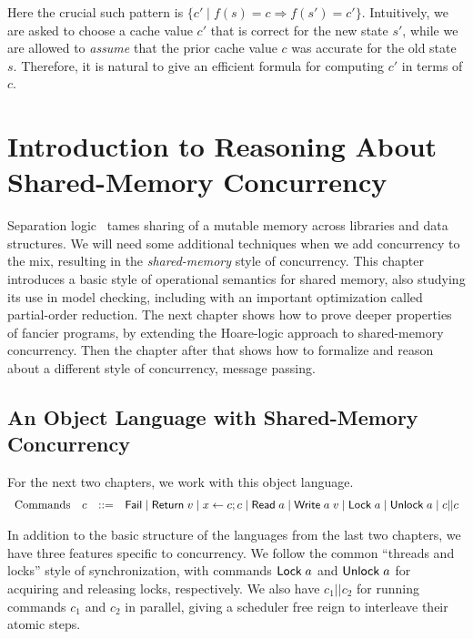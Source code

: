 \documentclass{amsbook}
\theoremstyle{definition}
\theoremstyle{remark}
\numberwithin{section}{chapter}
\numberwithin{equation}{chapter}
\begin{document}
Here the crucial such pattern is $\{c' \mid f(s) = c \Rightarrow f(s') = c'\}$.
Intuitively, we are asked to choose a cache value $c'$ that is correct for the new state $s'$, while we are allowed to \emph{assume} that the prior cache value $c$ was accurate for the old state $s$.
Therefore, it is natural to give an efficient formula for computing $c'$ in terms of $c$.



\chapter{Introduction to Reasoning About Shared-Memory Concurrency}\label{sharedmem}

Separation logic~ tames sharing of a mutable memory across libraries and data structures.
We will need some additional techniques when we add concurrency to the mix, resulting in the \emph{shared-memory} style of concurrency.
This chapter introduces a basic style of operational semantics for shared memory, also studying its use in model checking, including with an important optimization called partial-order reduction.
The next chapter shows how to prove deeper properties of fancier programs, by extending the Hoare-logic approach to shared-memory concurrency.
Then the chapter after that shows how to formalize and reason about a different style of concurrency, message passing.

\section{An Object Language with Shared-Memory Concurrency}

For the next two chapters, we work with this object language.
$$\begin{array}{rrcl}
  \textrm{Commands} & c &::=& \mathsf{Fail} \mid \mathsf{Return} \; v \mid x \leftarrow c; c \mid \mathsf{Read} \; a \mid \mathsf{Write} \; a \; v \mid \mathsf{Lock} \; a \mid \mathsf{Unlock} \; a \mid c || c
\end{array}$$

In addition to the basic structure of the languages from the last two chapters, we have three features specific to concurrency.
We follow the common ``threads and locks'' style of synchronization, with commands $\mathsf{Lock} \; a$ and $\mathsf{Unlock} \; a$ for acquiring and releasing locks, respectively.
We also have $c_1 || c_2$ for running commands $c_1$ and $c_2$ in parallel, giving a scheduler free reign to interleave their atomic steps.
\end{document}
